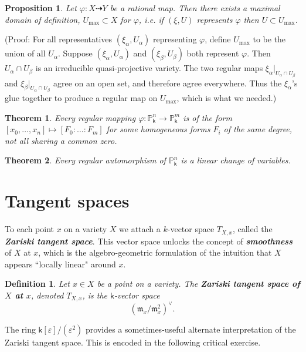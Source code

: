 \documentclass[11pt]{article}
\renewcommand{\P}{\mathbb{P}}
\renewcommand{\k}{\mathsf{k}}
\newcommand{\fm}{\mathfrak{m}}
\renewcommand{\to}{\longrightarrow}
\renewcommand{\k}{\mathsf{k}}
\renewcommand{\P}{\mathbb P}
\renewcommand{\to}{{\longrightarrow}}
\newtheorem{theorem}{Theorem}[section]
\newtheorem{proposition}{Proposition}[section]
\newtheorem{definition}{Definition}[section]
\begin{document}
\begin{proposition}
Let \(\varphi: X \dashrightarrow Y\) be a rational map.  Then there exists a maximal domain of definition, \(U_{\textrm{max}} \subset X\) for \(\varphi\), i.e. if \((\xi,U)\) represents \(\varphi\) then \(U \subset U_{\textrm{max}}\). 
\end{proposition}

(Proof: For all representatives \((\xi_{\alpha}, U_{\alpha})\) representing \(\varphi\), define \(U_{\textrm{max}}\) to be the union of all \(U_\alpha\). Suppose \((\xi_{\alpha}, U_{\alpha})\) and \((\xi_{\beta}, U_{\beta})\) both represent \(\varphi\). Then \(U_{\alpha} \cap U_{\beta}\) is an irreducible quasi-projective variety.  The two regular maps \(\xi_{\alpha}|_{U_{\alpha} \cap U_{\beta}}\) and \(\xi_{\beta}|_{U_{\alpha} \cap U_{\beta}}\) agree on an open set, and therefore agree everywhere.  Thus the \(\xi_{\alpha}\)'s glue together to produce a regular map on \(U_{\textrm{max}}\), which is what we needed.)


\begin{theorem}
Every regular mapping \(\varphi: \P^n_{\k} \to \P^m_{\k}\) is of the form \([x_0, \dots, x_n] \mapsto [F_0: \ldots : F_m]\) for some homogeneous forms \(F_{i}\) of the same degree, not all sharing a common zero.
\end{theorem}

\begin{theorem}
Every regular automorphism of \(\P^n_{\k}\) is a linear change of variables.
\end{theorem}

\section{Tangent spaces}
\label{sec:orge014519}
To each point \(x\) on a variety \(X\) we attach a \(k\)-vector space \(T_{X,x}\), called the \textbf{\emph{Zariski tangent space}}.   This vector space unlocks the concept of \textbf{\emph{smoothness}} of \(X\) at \(x\), which is the  algebro-geometric formulation of the intuition that \(X\) appears ``locally linear" around \(x\). 


\begin{definition}
Let \(x \in X\) be a point on a variety.  The \textbf{\emph{Zariski tangent space of \(X\) at \(x\)}}, denoted \(T_{X,x}\), is the \(\k\)-vector space \[\left( {\fm_{x}}/{\fm_{x}^2} \right)^{\vee}.\]
\end{definition}

The ring \(\k[\varepsilon]/(\varepsilon^2)\) provides a sometimes-useful alternate interpretation of the Zariski tangent space.  This is encoded in the following critical exercise. 
\end{document}
